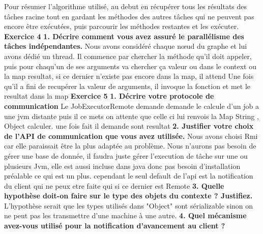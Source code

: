 \documentclass{article}
\begin{document}
Pour résumer l'algorithme utilisé, au debut en récupérer tous les résultats des tâches racine tout en gardant les méthodes 
des autres tâches qui ne peuvent pas encore être exécutées, puis parcourir les méthodes restantes et les exécuter.
\newline
\newline
\textbf{Exercice 4}
\newline
\textbf{1. Décrire comment vous avez assuré le parallélisme des tâches indépendantes.}
\newline
\newline
Nous avons considéré chaque nœud du graphe et lui avons dédié un thread. Il commence par chercher la 
méthode qu'il doit appeler, puis pour chaqu'un de ses arguments va chercher ça valeur ou dans le context ou la map resultat, si ce dernier n'existe pas encore dans la map, 
il attend Une fois qu'il a fini de recupérer la valeur de arguments, il invoque la fonction et met le resultat dans la map
\newline
\newline
\textbf{Exercice 5}
\newline
\textbf{1. Décrire votre protocole de communication}
\newline
Le JobExecutorRemote demande demande le calcule d'un job a une jvm distante puis il ce mets on attente
que celle ci lui renvois la Map String , Object  calculer.
une fois fait il demande sont resultat
\newline
\textbf{2. Justifier votre choix de l’API de communication que vous avez utilisée.}
\newline
Nous avons choisi Rmi car elle paraissait être la plus adaptée au problème. Nous n'aurons pas besoin de gérer une base de donnée,
il faudra juste gérer l'execution de tâche sur une ou plusieurs Jvm, elle est aussi incluse dans java donc pas besoin d'installation préalable ce qui est un plus.
cependant le seul default de l'api est la notification du client qui ne peux etre faite qui si ce dernier est Remote
\newline
\newline
\textbf{3. Quelle hypothèse doit-on faire sur le type des objets du contexte ? Justifiez.}
\newline
L'hypothèse serait que les types utilisés dans "Object" sont sérializable sinon on ne peut pas les 
transmettre d'une machine à une autre.
\newline
\newline
\textbf{4. Quel mécanisme avez-vous utilisé pour la notification d’avancement au client ?}
\end{document}
